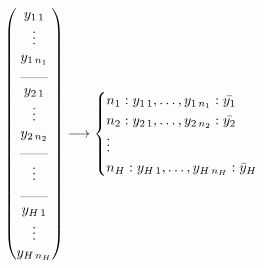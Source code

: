\begin{equation*}
	\begin{pmatrix}
		y_{1\,1} \\
		\vdots \\
		y_{1\,n_1} \\
		\rule{0.7cm}{0.2pt} \\
		y_{2\,1} \\
		\vdots \\
		y_{2\,n_2} \\
		\rule{0.7cm}{0.2pt} \\
		\vdots \\
		\rule{0.7cm}{0.2pt} \\
		y_{H\,1} \\
		\vdots \\
		y_{H\,n_H} \\
	\end{pmatrix}
	\longrightarrow 
	\begin{cases}
		n_1:y_{1\, 1},\dots , y_{1\, n_1}:\bar{y_{1}} \\
		n_2:y_{2\, 1},\dots , y_{2\, n_2}:\bar{y_{2}} \\
		\vdots \\
		n_H:y_{H\, 1},\dots , y_{H\, n_H}:\bar{y}_{H} \\
	\end{cases}
\end{equation*}
